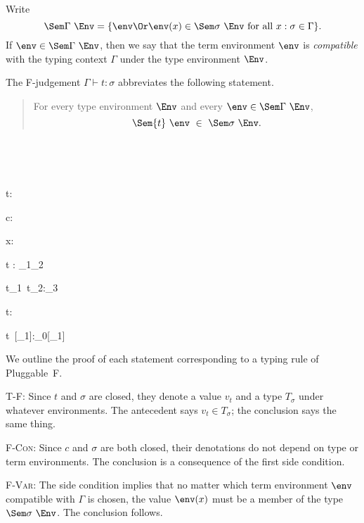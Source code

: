 \documentclass{amsart}
\theoremstyle{definition}
\begin{document}

Write
\[
\Sem\Gamma~\Env =
\{
\env\Or
\env(x)\in\Sem\sigma~\Env\text{ for all }
x:\sigma\in\Gamma
\}.
\]
If $\env\in\Sem\Gamma~\Env$, then we say that the term
environment $\env$ is \emph{compatible} with the typing context
$\Gamma$ under the type environment $\Env$.

The F-judgement $\Gamma\vdash t:\sigma$ abbreviates the
following statement.
\begin{quotation}
For every type environment $\Env$ and every $\env\in\Sem\Gamma~\Env$,
\[
\Sem{t}~\env~\in~\Sem\sigma~\Env.
\]
\end{quotation}~


~

{t:\sigma}

{\Gamma\vdash c:\sigma}

{\Gamma\vdash x:\sigma}

{\Gamma\vdash{}t : \sigma_1\R\sigma_2}

{\Gamma\vdash t_1~t_2:\sigma_3}

{\Gamma\vdash\Tabs\alpha t:\All\alpha\sigma}

{\Gamma\vdash t~[\sigma_1]:\sigma_0[\alpha\mapsto\sigma_1]}


\label{sound-F}

We outline the proof of each statement corresponding to a typing
rule of Pluggable~F.

\textsc{T-F}: Since $t$ and $\sigma$ are closed, they denote a
value $v_t$ and a type $T_\sigma$ under whatever environments.
The antecedent says $v_t\in T_\sigma$; the conclusion says the
same thing.

\textsc{F-Con}: Since $c$ and $\sigma$ are both closed, their
denotations do not depend on type or term environments. The
conclusion is a consequence of the first side condition.

\textsc{F-Var}: The
side condition implies that no matter which term environment
$\env$ compatible with $\Gamma$ is chosen, the value $\env(x)$
must be a member of the type $\Sem\sigma~\Env$. The conclusion
follows.
\end{document}
